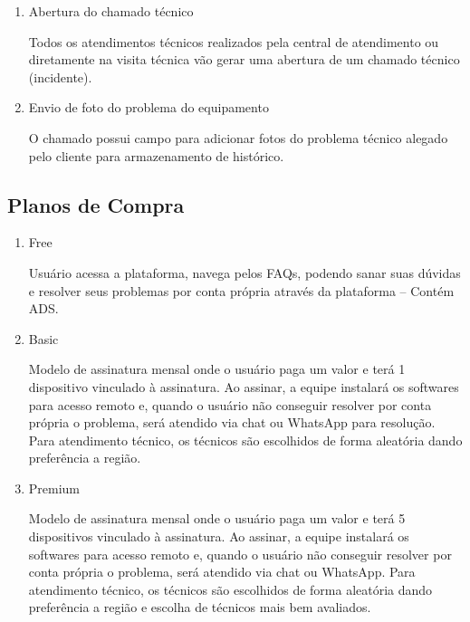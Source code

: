 \begin{enumerate}
	
	\item Abertura do chamado técnico
	
	Todos os atendimentos técnicos realizados pela central de atendimento ou diretamente na visita técnica vão gerar uma abertura de um chamado técnico (incidente).
	
	\item Envio de foto do problema do equipamento
	
	O chamado possui campo para adicionar fotos do problema técnico alegado pelo cliente para armazenamento de histórico.
	
\end{enumerate}

\subsection{Planos de Compra}

\begin{enumerate}
	
	\item Free
	
	Usuário acessa a plataforma, navega pelos FAQs, podendo sanar suas dúvidas e resolver seus problemas por conta própria através da plataforma – Contém ADS.
	
	\item Basic
	
	Modelo de assinatura mensal onde o usuário paga um valor e terá 1 dispositivo vinculado à assinatura. Ao assinar, a equipe instalará os softwares para acesso remoto e, quando o usuário não conseguir resolver por conta própria o problema, será atendido via chat ou WhatsApp para resolução. Para atendimento técnico, os técnicos são escolhidos de forma aleatória dando preferência a região.
	
	\item Premium
	
	Modelo de assinatura mensal onde o usuário paga um valor e terá 5 dispositivos vinculado à assinatura. Ao assinar, a equipe instalará os softwares para acesso remoto e, quando o usuário não conseguir resolver por conta própria o problema, será atendido via chat ou WhatsApp. Para atendimento técnico, os técnicos são escolhidos de forma aleatória dando preferência a região e escolha de técnicos mais bem avaliados.
	
\end{enumerate}

